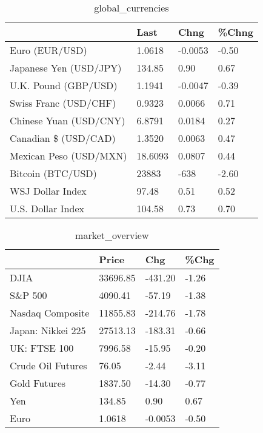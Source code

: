 \documentclass{article}%
\begin{document}
%


\begin{table}[htbp]%
\caption{global\_currencies}%
\centering%
\begin{adjustbox}{width=1\textwidth}%
\begin{tabular}{llll}
\toprule
                       &    Last &    Chng & \%Chng \\
\midrule
        Euro (EUR/USD) &  1.0618 & -0.0053 & -0.50 \\
Japanese Yen (USD/JPY) &  134.85 &    0.90 &  0.67 \\
  U.K. Pound (GBP/USD) &  1.1941 & -0.0047 & -0.39 \\
 Swiss Franc (USD/CHF) &  0.9323 &  0.0066 &  0.71 \\
Chinese Yuan (USD/CNY) &  6.8791 &  0.0184 &  0.27 \\
  Canadian \$ (USD/CAD) &  1.3520 &  0.0063 &  0.47 \\
Mexican Peso (USD/MXN) & 18.6093 &  0.0807 &  0.44 \\
     Bitcoin (BTC/USD) &   23883 &    -638 & -2.60 \\
      WSJ Dollar Index &   97.48 &    0.51 &  0.52 \\
     U.S. Dollar Index &  104.58 &    0.73 &  0.70 \\
\bottomrule
\end{tabular}
%
\end{adjustbox}%
\end{table}

%


\begin{table}[htbp]%
\caption{market\_overview}%
\centering%
\begin{adjustbox}{width=1\textwidth}%
\begin{tabular}{llll}
\toprule
                  &    Price &     Chg &  \%Chg \\
\midrule
             DJIA & 33696.85 & -431.20 & -1.26 \\
          S\&P 500 &  4090.41 &  -57.19 & -1.38 \\
 Nasdaq Composite & 11855.83 & -214.76 & -1.78 \\
Japan: Nikkei 225 & 27513.13 & -183.31 & -0.66 \\
     UK: FTSE 100 &  7996.58 &  -15.95 & -0.20 \\
Crude Oil Futures &    76.05 &   -2.44 & -3.11 \\
     Gold Futures &  1837.50 &  -14.30 & -0.77 \\
              Yen &   134.85 &    0.90 &  0.67 \\
             Euro &   1.0618 & -0.0053 & -0.50 \\
\bottomrule
\end{tabular}
%
\end{adjustbox}%
\end{table}

%
\end{document}
